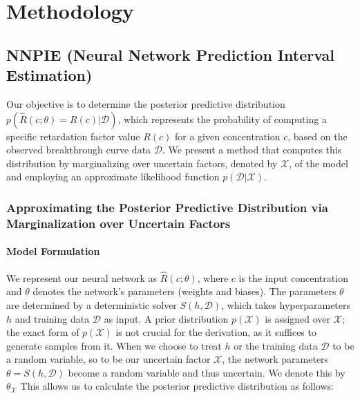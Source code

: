 \section{Methodology}
\subsection{NNPIE (Neural Network Prediction Interval Estimation)}
Our objective is to determine the posterior predictive distribution $p(\hat{R}(c; \theta) = R(c)| \mathcal{D})$, which represents the probability of computing a specific retardation factor value $R(c)$ for a given concentration $c$, based on the observed breakthrough curve data $\mathcal{D}$. We present a method that computes this distribution by marginalizing over uncertain factors, denoted by $\mathcal{X}$, of the model and employing an approximate likelihood function $p(\mathcal{D} | \mathcal{X})$.

\subsubsection{Approximating the Posterior Predictive Distribution via Marginalization over Uncertain Factors}

\paragraph{Model Formulation}

We represent our neural network as $\hat{R}(c; \theta)$, where $c$ is the input concentration and $\theta$ denotes the network's parameters (weights and biases). The parameters $\theta$ are determined by a deterministic solver $S(h, \mathcal{D})$, which takes hyperparameters $h$ and training data $\mathcal{D}$ as input. A prior distribution $p(\mathcal{X})$ is assigned over $\mathcal{X}$; the exact form of $p(\mathcal{X})$ is not crucial for the derivation, as it suffices to generate samples from it.
When we choose to treat $h$ or the training data $\mathcal{D}$ to be a random variable, so to be our uncertain factor $\mathcal{X}$, the network parameters $\theta = S(h, \mathcal{D})$ become a random variable and thus uncertain. We denote this by $\theta_{\mathcal{X}}$ This allows us to calculate the posterior predictive distribution as follows:

